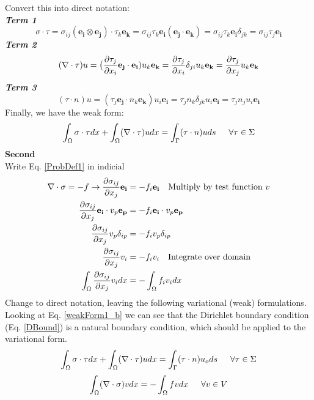 \documentclass[12pt,3p]{article}
\begin{document}
Convert this into direct notation: \\
\textit{\textbf{Term 1}}
\begin{equation*}
\sigma \cdot \tau = \sigma_{ij} (\mathbf{e_i} \otimes \mathbf{e_j}) \cdot \tau_k \mathbf{e_k} = \sigma_{ij} \tau_k \mathbf{e_i} (\mathbf{e_j} \cdot \mathbf{e_k}) =  \sigma_{ij} \tau_k \mathbf{e_i} \delta_{jk} = \sigma_{ij} \tau_j \mathbf{e_i}
\end{equation*}
\textit{\textbf{Term 2}}
\begin{equation*}
(\nabla \cdot \tau) u = \big( \pdv{\tau_j}{x_i} \mathbf{e_j} \cdot \mathbf{e_i}) u_k \mathbf{e_k} =  \pdv{\tau_j}{x_i} \delta_{ji} u_k \mathbf{e_k} = \pdv{\tau_j}{x_j} u_k \mathbf{e_k} 
\end{equation*}
\textit{\textbf{Term 3}}
\begin{equation*}
(\tau \cdot n) u = (\tau_j \mathbf{e_j} \cdot n_k \mathbf{e_k}) u_i \mathbf{e_i} = \tau_j n_k \delta_{jk} u_i \mathbf{e_i} = \tau_j n_j u_i \mathbf{e_i}
\end{equation*}
Finally, we have the weak form: 
\begin{equation}\label{weakForm1_b}
\int_{\Omega} \sigma \cdot \tau dx + \int_{\Omega} (\nabla \cdot \tau) u dx = \int_{\Gamma} (\tau \cdot n) u ds \indent \forall \tau \in \Sigma
\end{equation}
\textbf{Second} \\
Write Eq. \ref{ProbDef1} in indicial 
\begin{align*}
\nabla \cdot \sigma = -f \rightarrow \pdv{\sigma_{ij}}{x_j} \mathbf{e_i} &= - f_i \mathbf{e_i} \quad \text{Multiply by test function } v \\
\pdv{\sigma_{ij}}{x_j} \mathbf{e_i} \cdot v_p \mathbf{e_p} &= - f_i \mathbf{e_i} \cdot v_p \mathbf{e_p}  \\ 
\pdv{\sigma_{ij}}{x_j} v_p \delta_{ip} &= - f_i v_p \delta_{ip}  \\
\pdv{\sigma_{ij}}{x_j} v_i &= - f_i v_i \quad \text{Integrate over domain} \\
\int_{\Omega} \pdv{\sigma_{ij}}{x_j} v_i dx &= - \int_{\Omega} f_i v_i dx 
\end{align*}
Change to direct notation, leaving the following variational (weak) formulations. Looking at Eq. \ref{weakForm1_b} we can see that the Dirichlet boundary condition (Eq. \ref{DBound}) is a natural boundary condition, which should be applied to the variational form.
\begin{equation}\label{WeakForm1}
\int_{\Omega} \sigma \cdot \tau dx + \int_{\Omega} (\nabla \cdot \tau) u dx = \int_{\Gamma} (\tau \cdot n) u_o ds \indent \forall \tau \in \Sigma
\end{equation}
\begin{equation}\label{WeakForm2}
\int_{\Omega} (\nabla \cdot \sigma) v dx = - \int_{\Omega} fv dx \indent \forall v \in V
\end{equation}
\end{document}
